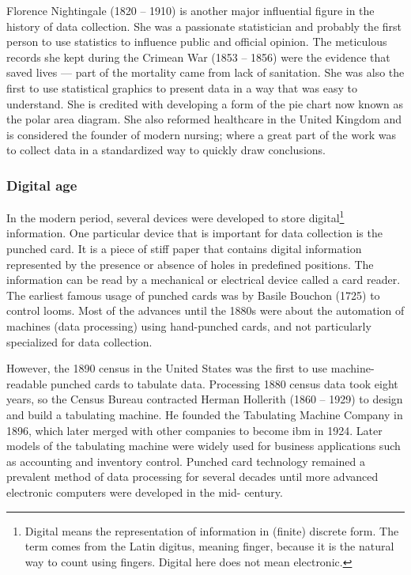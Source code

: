 Florence Nightingale (1820 -- 1910) is another major influential figure in the history of
data collection.  She was a passionate statistician
and probably the first person to use statistics to influence public and official
opinion.  The meticulous records she kept during the Crimean War
(1853 -- 1856) were the evidence that saved lives --- part of the mortality came from lack
of sanitation.  She was also the first to use
statistical graphics to present data in a way that was easy to understand.  She is
credited with developing a form of the pie chart now known as the polar area
diagram.  She also reformed healthcare in the United Kingdom and
is considered the founder of modern nursing; where a great part of the work was to collect
data in a standardized way to quickly draw conclusions.

\subsubsection{Digital age}

In the modern period, several devices were developed to store digital\footnote{Digital
means the representation of information in (finite) discrete form.  The term comes from the Latin
digitus, meaning finger, because it is the natural way to count using fingers.  Digital
here does not mean electronic.}
information.  One particular device that is important for data collection is the punched
card.  It is a piece of stiff paper that contains digital information represented by the
presence or absence of holes in predefined positions.  The information can be read by a
mechanical or electrical device called a card reader.  The earliest famous usage of
punched cards was by Basile Bouchon (1725) to control looms.  Most of the advances until
the 1880s were about the automation of machines (data processing) using hand-punched cards, and not
particularly specialized for data collection.

However, the 1890 census in the United States was the first to use machine-readable
punched cards to tabulate data. Processing 1880 census data took eight years, so the
Census Bureau contracted Herman Hollerith (1860 -- 1929) to design and build a tabulating
machine.  He founded the Tabulating Machine Company in 1896, which later merged with other
companies to become \gls{ibm} in 1924. Later
models of the tabulating machine were widely used for business applications such as
accounting and inventory control. Punched card technology remained a prevalent method of
data processing for several decades until more advanced electronic computers were
developed in the mid- century.

